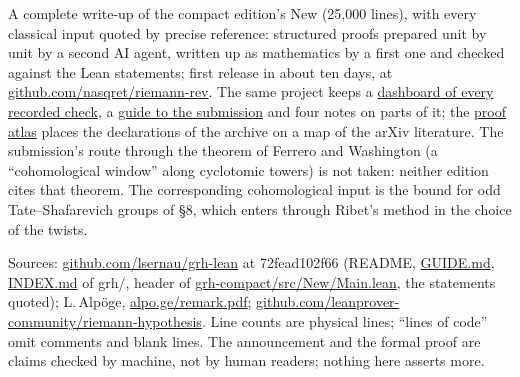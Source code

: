 \documentclass[11pt,a4paper]{article}
\newcommand{\code}[1]{{\ttfamily\small\color{lean}#1}}
\newcommand{\lk}[2]{\href{#1}{\code{#2}}}
\newcommand{\B}{https://github.com/lsernau/grh-lean/blob/72fead102f663d5c7a407964a13dc0cf9d977207/grh-compact/}
\newcommand{\RR}{https://github.com/lsernau/grh-lean/blob/72fead102f663d5c7a407964a13dc0cf9d977207/}
\newcommand{\head}[1]{\par\addvspace{11pt}\Needspace{6\baselineskip}\noindent{\large\bfseries\color{ink}#1}\par\nopagebreak\vspace{2pt}}
\begin{document}
\head{10. What we are doing next}
A complete write-up of the compact edition's \code{New} (25{,}000 lines), with every classical input quoted by precise
reference: structured proofs prepared unit by unit by a second AI agent, written up as mathematics by a first one and
checked against the Lean statements; first release in about ten days, at
\href{https://github.com/nasqret/riemann-rev}{\code{github.com/nasqret/riemann-rev}}. The same project keeps a
\href{https://github.com/nasqret/riemann-rev\#status-dashboard}{dashboard of every recorded check}, a
\href{https://nasqret.github.io/riemann-rev/guide/proof-guide.pdf}{guide to the submission} and four notes on parts of
it; the \href{https://nasqret.github.io/riemann-proof-atlas/}{proof atlas} places the declarations of the archive on a
map of the arXiv literature. The submission's route through the theorem of Ferrero and Washington (a
``cohomological window'' along cyclotomic towers) is not taken: neither edition cites that theorem. The corresponding
cohomological input is the bound for odd Tate--Shafarevich groups of §8, which enters through Ribet's method in the
choice of the twists.

\vspace{3pt}
{\footnotesize\color{inksoft}Sources: \href{https://github.com/lsernau/grh-lean/tree/72fead102f663d5c7a407964a13dc0cf9d977207}{\code{github.com/lsernau/grh-lean}} at \code{72fead102f66} (README,
\lk{\RR grh/GUIDE.md}{GUIDE.md}, \lk{\RR grh/INDEX.md}{INDEX.md} of \code{grh/}, header of \lk{\B src/New/Main.lean}{grh-compact/src/New/Main.lean}, the statements quoted); L.\,Alpöge,
\href{https://alpo.ge/remark.pdf}{\code{alpo.ge/remark.pdf}}; \href{https://github.com/leanprover-community/riemann-hypothesis}{\code{github.com/leanprover-community/riemann-hypothesis}}.
Line counts are physical lines; ``lines of code'' omit comments and blank lines. The announcement and the formal proof
are claims checked by machine, not by human readers; nothing here asserts more.}
\end{document}
